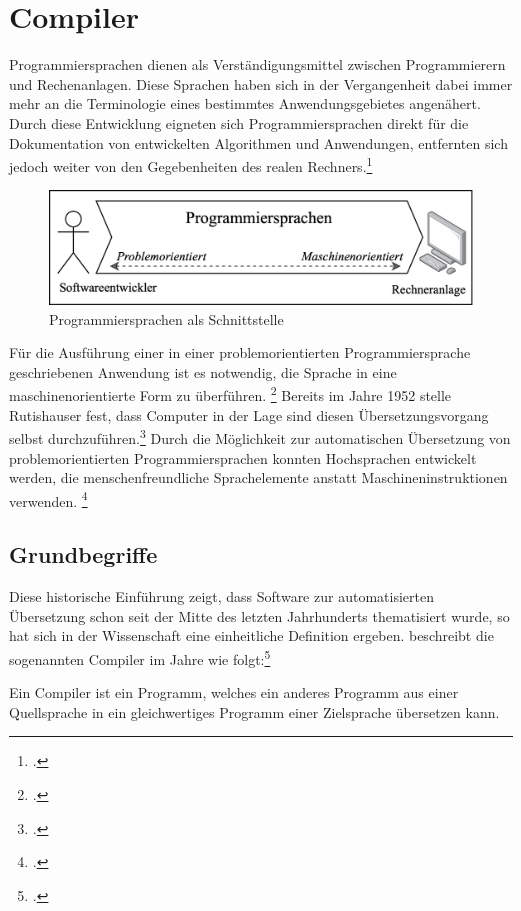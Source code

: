 \chapter{Compiler}
Programmiersprachen dienen als Verständigungsmittel zwischen Programmierern und Rechenanlagen. Diese Sprachen haben sich in der Vergangenheit dabei immer mehr an die  Terminologie eines bestimmtes Anwendungsgebietes angenähert. Durch diese Entwicklung eigneten sich Programmiersprachen direkt für die Dokumentation von entwickelten Algorithmen und Anwendungen, entfernten sich jedoch weiter von den Gegebenheiten des realen Rechners.\footcite[Vgl.][S. 15]{Schneider1975}
\begin{figure}[h]
 \includegraphics[width=\textwidth,height=\textheight,keepaspectratio]{Images/LanguageIntermediary.png}
 \caption{Programmiersprachen als Schnittstelle}
 \label{fig:Programmiersprachen als Schnittstelle}
\end{figure}
Für die Ausführung einer in einer problemorientierten Programmiersprache geschriebenen Anwendung ist es notwendig, die Sprache in eine maschinenorientierte Form zu überführen. \footcite[Vgl.][S. 15]{Schneider1975} Bereits im Jahre 1952 stelle Rutishauser fest,  dass Computer in der Lage sind diesen Übersetzungsvorgang selbst durchzuführen.\footcite[Vgl.][S. 312]{Rutishauser1952} 
Durch die Möglichkeit zur automatischen Übersetzung von problemorientierten Programmiersprachen konnten Hochsprachen entwickelt werden, die menschenfreundliche Sprachelemente anstatt Maschineninstruktionen verwenden. \footcite[Vgl.][S. 47]{Wagenknecht2014}
\section{ Grundbegriffe}
Diese historische Einführung zeigt,  dass Software zur automatisierten Übersetzung schon seit der Mitte des letzten Jahrhunderts thematisiert wurde, so hat sich in der Wissenschaft eine einheitliche Definition ergeben.  \citeauthor{Ullmann2008} beschreibt die sogenannten Compiler im Jahre \citeyear{Ullmann2008} wie folgt:\footcite[Vgl.][S. 1]{Ullmann2008} 
\begin{Def}[Compiler]
Ein Compiler ist ein Programm, welches ein anderes Programm aus einer Quellsprache in ein gleichwertiges Programm einer Zielsprache übersetzen kann.
\end{Def} 
\vspace{-1em}

